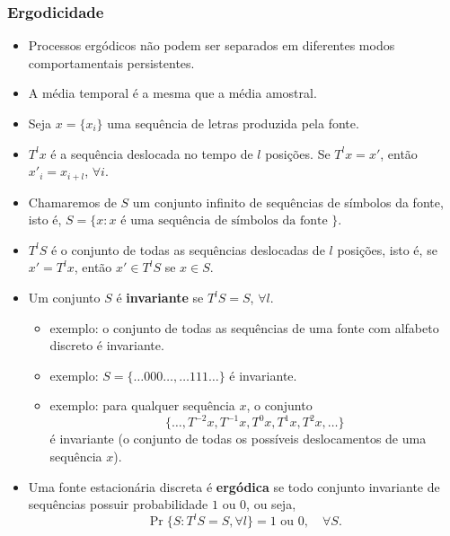 \begin{frame}[allowframebreaks]
  \frametitle{Ergodicidade}
  \begin{itemize}
  \item Processos ergódicos não podem ser separados em diferentes modos comportamentais persistentes.
  \item A média temporal é a mesma que a média amostral.
  \item Seja $x = \{x_i\}$ uma sequência de letras produzida pela fonte.
  \item $T^l x$ é a sequência deslocada no tempo de $l$ posições. 
	Se $T^l x = x'$, então $x'_i = x_{i+l}$, $\forall i$.
  \item Chamaremos de $S$ um conjunto infinito de sequências de símbolos da fonte,
	isto é, $S = \{x : x \text{ é uma sequência de símbolos da fonte } \}$.
  \item $T^l S$ é o conjunto de todas as sequências deslocadas de $l$ posições, isto é,
	se $x' = T^l x$, então $x' \in T^l S$ se $x \in S$.
  \item Um conjunto $S$ é \textbf{invariante} se $T^l S = S$, $\forall l$.
	\begin{itemize}
	\item exemplo: o conjunto de todas as sequências de uma fonte com alfabeto discreto é invariante.
	\item exemplo: $S = \{ \ldots 000 \ldots , \ldots 111 \ldots \}$ é invariante.
	\item exemplo: para qualquer sequência $x$, o conjunto
		\begin{equation}
		\{ \ldots, T^{-2}x, T^{-1}x, T^{0}x, T^1 x, T^2 x , \ldots  \}
		\end{equation}
		é invariante (o conjunto de todas os possíveis deslocamentos de uma sequência $x$).
	\end{itemize}
  \item Uma fonte estacionária discreta é \textbf{ergódica} se todo conjunto invariante de
	sequências possuir probabilidade $1$ ou $0$, ou seja,
		\begin{equation}
		\Pr \{ S: T^l S = S, \forall l \} = 1 \text{ ou } 0, \quad \forall S .
		\end{equation}
  \end{itemize}
\end{frame}


